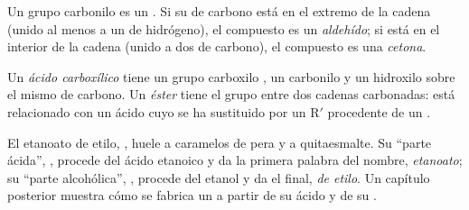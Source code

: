 \begin{definition}\label{def:g11:functional-groups:carbonyl}
Un grupo carbonilo es un  . Si su  de carbono
está en el extremo de la cadena (unido al menos a un  de
hidrógeno), el compuesto es un \emph{aldehído}; si está
en el interior de la cadena (unido a dos  de carbono), el
compuesto es una \emph{cetona}.
\end{definition}

\begin{definition}\label{def:g11:functional-groups:carboxylic-acid}
Un \emph{ácido carboxílico} tiene un grupo
carboxilo , un carbonilo y un hidroxilo sobre el mismo 
de carbono. Un \emph{éster} tiene el grupo  entre
dos cadenas carbonadas: está relacionado con un ácido cuyo  se
ha sustituido por un R$'$ procedente de un .
\end{definition}

\begin{example}\label{ex:g11:functional-groups:ethyl-ethanoate}
El  etanoato de etilo, , huele a
caramelos de pera y a quitaesmalte. Su ``parte ácida'', ,
procede del ácido etanoico  y da la primera palabra del
nombre, \emph{etanoato}; su ``parte alcohólica'', , procede
del etanol  y da el final, \emph{de etilo}. Un capítulo
posterior muestra cómo se fabrica un  a partir de su ácido y de su
.
\end{example}

